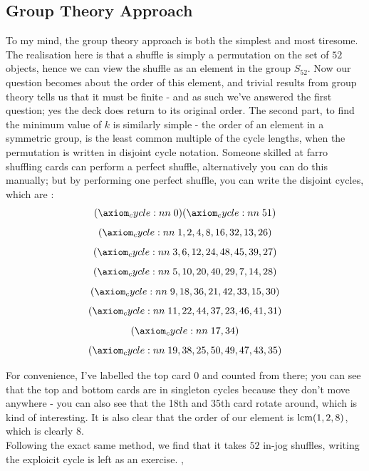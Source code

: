\documentclass[../Axiomathic.tex]{subfiles}
\begin{document}
\subsection{Group Theory Approach}
To my mind, the group theory approach is both the simplest and most tiresome. The realisation here is that a shuffle is simply a permutation on the set of $52$ objects, hence we can view the shuffle as an element in the group $S_{52}$. Now our question becomes about the order of this element, and trivial results from group theory tells us that it must be finite - and as such we've answered the first question; yes the deck does return to its original order. The second part, to find the minimum value of $k$ is similarly simple - the order of an element in a symmetric group, is the least common multiple of the cycle lengths, when the permutation is written in disjoint cycle notation. Someone skilled at farro shuffling cards can perform a perfect shuffle, alternatively you can do this manually; but by performing one perfect shuffle, you can write the disjoint cycles, which are :\[\cycle{0} \cycle{51}\] \[\cycle{1, 2, 4, 8, 16, 32, 13, 26}\] \[\cycle{3, 6, 12, 24, 48, 45, 39, 27}\]\[\cycle{5, 10, 20, 40, 29, 7, 14, 28}\]\[\cycle{9, 18, 36, 21, 42, 33, 15, 30}\] \[\cycle{11,22,44,37,23,46,41,31}\]\[ \cycle{17,34}\] \[\cycle{19,38,25,50,49,47,43,35}\]

For convenience, I've labelled the top card $0$ and counted from there; you can see that the top and bottom cards are in singleton cycles because they don't move anywhere - you can also see that the 18th and 35th card rotate around, which is kind of interesting. It is also clear that the order of our element is $\operatorname{lcm}(1,2,8)$, which is clearly 8.\\ 
Following the exact same method, we find that it takes $52$ in-jog shuffles, writing the exploicit cycle is left as an exercise. 
,
\end{document}
